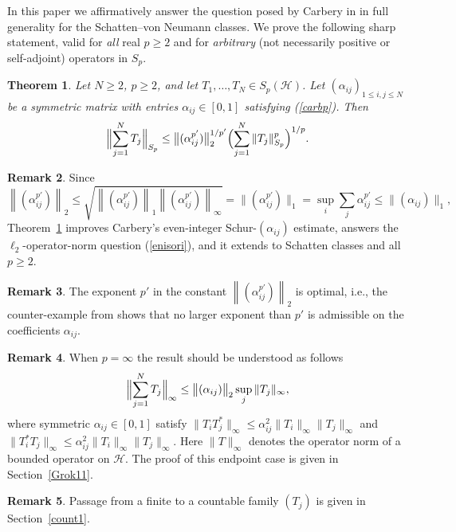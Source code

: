 \documentclass[11pt]{article}
\newtheorem{theorem}{Theorem}[section]
\theoremstyle{definition}
\newtheorem{remark}[theorem]{Remark}
\newcommand{\norm}[1]{\left\lVert #1 \right\rVert}
\newcommand{\1}{\mathbf{1}}
\begin{document}
In this paper we  affirmatively answer the question posed by Carbery in \cite[Section~3.3, (3.1)]{Carbery2009} in full generality for the Schatten--von Neumann classes. We prove the following sharp statement, valid for \emph{all} real $p\geq 2$ and for \emph{arbitrary} (not necessarily positive or self-adjoint) operators in $S_{p}$. 

\begin{theorem}\label{mainthm}
Let $N\geq 2$,  $p\geq 2$,  and let $T_1,\dots,T_N\in S_p(\mathcal{H})$. Let $(\alpha_{ij})_{1\leq i,j\leq N}$ be a symmetric matrix with entries $\alpha_{ij} \in [0,1]$ satisfying (\ref{carbp}). Then
\[
\Bigl\|\sum_{j=1}^N T_j\Bigr\|_{S_p}
\leq
\bigl\|(\alpha_{ij}^{p'})\bigr\|_{2}^{1/p'}
\Bigl(\sum_{j=1}^N\|T_j\|_{S_p}^p\Bigr)^{1/p}.
\]
\end{theorem}


\begin{remark}
    Since
\[
   \norm{(\alpha_{ij}^{p'})}_{2}
   \le
   \sqrt{\norm{(\alpha_{ij}^{p'})}_{1} \norm{(\alpha_{ij}^{p'})}_{\infty}} = \|(\alpha^{p'}_{ij})\|_{1}=
   \sup_i\sum_j \alpha^{p'}_{ij}\leq \|(\alpha_{ij})\|_{1},
\]
Theorem~\ref{mainthm} improves Carbery’s even-integer Schur-$(\alpha_{ij})$ estimate,  answers the $\ell_{2}$-operator-norm question (\ref{enisori}), and it extends \cite[Theorem~1.1]{CDPIMW2026}  to Schatten classes and all $p\geq 2$. 
\end{remark}

\begin{remark}
    The exponent $p'$ in the constant  $\norm{(\alpha_{ij}^{p'})}_{2}$ is optimal, i.e.,  the counter-example from \cite{CDPIMW2026}
   shows that no larger exponent than $p'$ is admissible on the coefficients $\alpha_{ij}$.
\end{remark}

\begin{remark}
    When $p=\infty$ the result should be understood as follows 
\[
\Bigl\|\sum_{j=1}^N T_j\Bigr\|_{\infty}
\leq
\bigl\|(\alpha_{ij})\bigr\|_{2} \sup_{j} 
\|T_j\|_{\infty},
\]
where symmetric  $\alpha_{ij} \in [0,1]$ satisfy $\| T_{i}T_{j}^{*}\|_{\infty}\leq \alpha_{ij}^{2}\|T_{i}\|_{\infty}\|T_{j}\|_{\infty}$ and $\| T_{i}^{*}T_{j}\|_{\infty}\leq \alpha_{ij}^{2}\|T_{i}\|_{\infty}\|T_{j}\|_{\infty}$. Here $\| T\|_{\infty}$ denotes the operator norm of a bounded operator on $\mathcal{H}$. The proof of this endpoint case is given in Section~\ref{Grok11}.
\end{remark}

\begin{remark}
    Passage from a finite to a countable family $(T_{j})$ is given in Section~\ref{count1}.
\end{remark}
\end{document}
